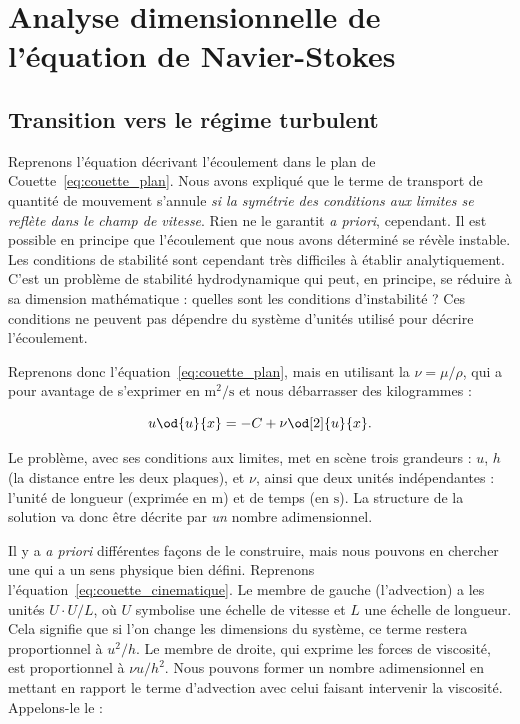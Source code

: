 \section{Analyse dimensionnelle de l'équation de Navier-Stokes}

\subsection{Transition vers le régime turbulent \label{ssec:turbulent}}
Reprenons l'équation décrivant l'écoulement dans le plan de Couette~\eqref{eq:couette_plan}. Nous avons expliqué que le terme de transport de quantité de mouvement s'annule \emph{si la symétrie des conditions aux limites se reflète dans le champ de vitesse}. Rien ne le garantit \emph{a priori}, cependant. Il est possible en principe que l'écoulement que nous avons déterminé se révèle instable. Les conditions de stabilité sont cependant très difficiles à établir analytiquement. C'est un problème de stabilité hydrodynamique qui peut, en principe, se réduire à sa dimension mathématique : quelles sont les conditions d'instabilité ? Ces conditions ne peuvent pas dépendre du système d'unités utilisé pour décrire l'écoulement.

Reprenons donc l'équation~\eqref{eq:couette_plan}, mais en utilisant la  $\nu = \mu/\rho$, qui a pour avantage de s'exprimer en $\mathrm{m}^2/\mathrm{s}$ et nous débarrasser des kilogrammes :

\begin{equation}
  u \od{u}{x} = -C + \nu \od[2]{u}{x}.
  \label{eq:couette_cinematique}
\end{equation}

Le problème, avec ses conditions aux limites, met en scène trois grandeurs : $u$, $h$ (la distance entre les deux plaques), et $\nu$, ainsi que deux unités indépendantes : l'unité de longueur (exprimée en $\mathrm{m}$) et de temps (en $\mathrm{s}$). La structure de la solution va donc être décrite par \emph{un} nombre adimensionnel.

Il y a \emph{a priori} différentes façons de le construire, mais nous pouvons en chercher une qui a un sens physique bien défini. Reprenons l'équation~\eqref{eq:couette_cinematique}. Le membre de gauche (l'advection) a les unités $U \cdot U/L$, où $U$ symbolise une échelle de vitesse et $L$ une échelle de longueur. Cela signifie que si l'on change les dimensions du système, ce terme restera proportionnel à $u^2/h$.
Le membre de droite, qui exprime les forces de viscosité, est proportionnel à $\nu u / h^2$. Nous pouvons former un nombre adimensionnel en mettant en rapport le terme d'advection avec celui faisant intervenir la viscosité. Appelons-le le  :

